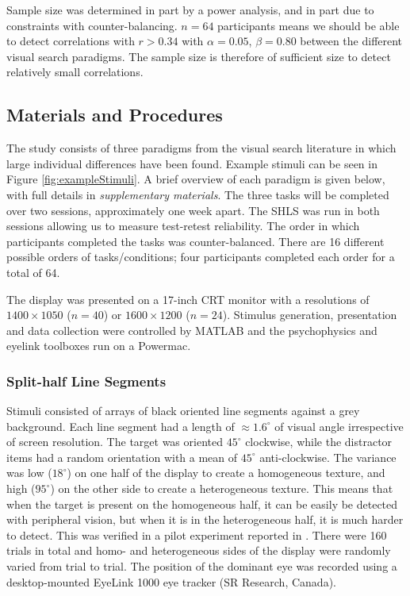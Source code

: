 \documentclass[]{rsos}%
\begin{document}
Sample size was determined in part by a power analysis, and in part due to constraints with counter-balancing. $n = 64$ participants means we should be able to detect correlations with $r > 0.34$ with $\alpha = 0.05$, $\beta = 0.80$ between the different visual search paradigms. The sample size is therefore of sufficient size to detect relatively small correlations.

\subsection{Materials and Procedures}

The study consists of three paradigms from the visual search literature in which large individual differences have been  found\cite{nowakowska2017, irons-leber2016, kristjansson2014}. Example stimuli can be seen in Figure \ref{fig:exampleStimuli}. A brief overview of each paradigm is given below, with full details in \textit{supplementary materials}. The three tasks will be completed over two sessions, approximately one week apart. The SHLS was run in both sessions allowing us to measure test-retest reliability. The order in which participants completed the tasks was counter-balanced. There are 16 different possible orders of tasks/conditions; four participants completed each order for a total of 64.

The display was presented on a 17-inch CRT monitor with a resolutions of $1400 \times 1050$ ($n = 40$) or $1600 \times 1200$ ($n = 24$). Stimulus generation, presentation and data collection were controlled by MATLAB and the psychophysics and eyelink toolboxes \cite{brainard1997,cornelissen2002} run on a Powermac. 

\subsubsection{Split-half Line Segments}

Stimuli consisted of arrays of black oriented line segments against a grey background. Each line segment had a length of $\approx$$1.6^{\circ}$ of visual angle irrespective of screen resolution. The target was oriented $45^{\circ}$ clockwise, while the distractor items had a random orientation with a mean of $45^{\circ}$ anti-clockwise. The variance was low ($18^{\circ}$) on one half of the display to create a homogeneous texture, and high ($95^{\circ}$) on the other side to create a heterogeneous texture. This means that when the target is present on the homogeneous half, it can be easily be detected with peripheral vision, but when it is in the heterogeneous half, it is much harder to detect. This was verified in a pilot experiment reported in \cite{nowakowska2017}.  There were 160 trials in total and homo- and heterogeneous sides of the display were randomly varied from trial to trial. The position of the dominant eye was recorded using a desktop-mounted EyeLink 1000 eye tracker (SR Research, Canada). 
\end{document}
